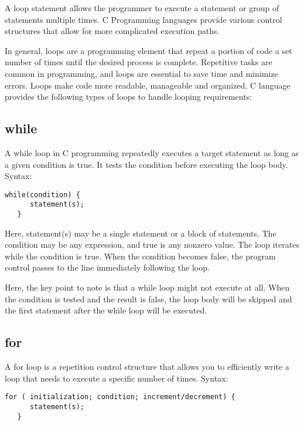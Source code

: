 A loop statement allows the programmer to execute a statement or group of statements multiple times. C Programming languages provide various control structures that allow for more complicated execution paths.

\par In general, loops are a programming element that repeat a portion of code a set number of times until the desired process is complete. Repetitive tasks are common in programming, and loops are essential to save time and minimize errors. Loops make code more readable, manageable and organized. C language provides the following types of loops to handle looping requirements:

\subsection{while}
A while loop in C programming repeatedly executes a target statement as long as a given condition is true. It tests the condition before executing the loop body. Syntax:

\begin{lstlisting}[style=CStyle]
   while(condition) {
      statement(s);
   }
\end{lstlisting}

Here, statement(s) may be a single statement or a block of statements. The condition may be any expression, and true is any nonzero value. The loop iterates while the condition is true. When the condition becomes false, the program control passes to the line immediately following the loop.

\par Here, the key point to note is that a while loop might not execute at all. When the condition is tested and the result is false, the loop body will be skipped and the first statement after the while loop will be executed.


\subsection{for}
A for loop is a repetition control structure that allows you to efficiently write a loop that needs to execute a specific number of times. Syntax:

\begin{lstlisting}[style=CStyle]
   for ( initialization; condition; increment/decrement) {
      statement(s);
   }
\end{lstlisting}

